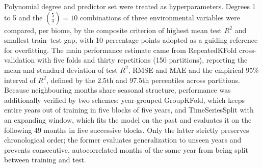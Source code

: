 \documentclass[a4paper,fleqn]{cas-sc}
\begin{document}
Polynomial degree and predictor set were treated as hyperparameters. Degrees 1 to 5 and the $\binom{5}{3} = 10$ combinations of three environmental variables were compared, per biome, by the composite criterion of highest mean test $R^2$ and smallest train--test gap, with 10 percentage points adopted as a guiding reference for overfitting. The main performance estimate came from RepeatedKFold cross-validation with five folds and thirty repetitions (150 partitions), reporting the mean and standard deviation of test $R^2$, RMSE and MAE and the empirical 95\% interval of $R^2$, defined by the 2.5th and 97.5th percentiles across partitions. Because neighbouring months share seasonal structure, performance was additionally verified by two schemes: year-grouped GroupKFold, which keeps entire years out of training in five blocks of five years, and TimeSeriesSplit with an expanding window, which fits the model on the past and evaluates it on the following 49 months in five successive blocks. Only the latter strictly preserves chronological order; the former evaluates generalization to unseen years and prevents consecutive, autocorrelated months of the same year from being split between training and test.
\end{document}
